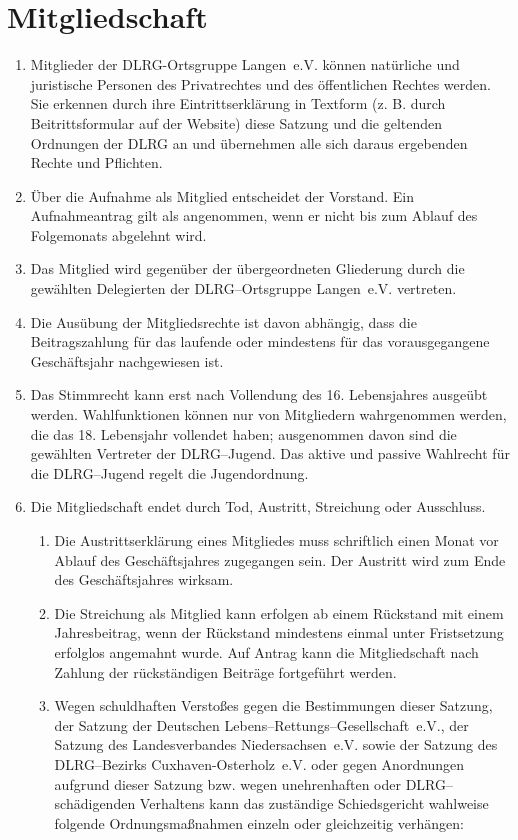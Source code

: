 \documentclass[%
12pt, %
a4paper, %
headsepline, %
parskip, %
headings=normal, %
]{scrreprt}
\begin{document}
\section{Mitgliedschaft}
\label{sec:mitgliedschaft}
\begin{enumerate}
    \item Mitglieder der DLRG-Ortsgruppe Langen~e.V. können natürliche und juristische Personen des Privatrechtes und des öffentlichen Rechtes werden. Sie erkennen durch ihre Eintrittserklärung in Textform (z. B. durch Beitrittsformular auf der Website) diese Satzung und die geltenden Ordnungen der DLRG an und übernehmen alle sich daraus ergebenden Rechte und Pflichten.
    \item Über die Aufnahme als Mitglied entscheidet der Vorstand. Ein Aufnahmeantrag gilt als angenommen, wenn er nicht bis zum Ablauf des Folgemonats abgelehnt wird.
    \item Das Mitglied wird gegenüber der übergeordneten Gliederung durch die gewählten Delegierten der DLRG--Ortsgruppe Langen~e.V. vertreten.
    \item Die Ausübung der Mitgliedsrechte ist davon abhängig, dass die Beitragszahlung für das laufende oder mindestens für das vorausgegangene Geschäftsjahr nachgewiesen ist.
    \item Das Stimmrecht kann erst nach Vollendung des 16. Lebensjahres ausgeübt werden. Wahlfunktionen können nur von Mitgliedern wahrgenommen werden, die das 18. Lebensjahr vollendet haben; ausgenommen davon sind die gewählten Vertreter der DLRG--Jugend. Das aktive und passive Wahlrecht für die DLRG--Jugend regelt die Jugendordnung.
    \item Die Mitgliedschaft endet durch Tod, Austritt, Streichung oder Ausschluss.\begin{enumerate}[noitemsep]
        \item Die Austrittserklärung eines Mitgliedes muss schriftlich einen Monat vor Ablauf des Geschäftsjahres zugegangen sein. Der Austritt wird zum Ende des Geschäftsjahres wirksam.
        \item Die Streichung als Mitglied kann erfolgen ab einem Rückstand mit einem Jahresbeitrag, wenn der Rückstand mindestens einmal unter Fristsetzung erfolglos angemahnt wurde. Auf Antrag kann die Mitgliedschaft nach Zahlung der rückständigen Beiträge fortgeführt werden.
        \item Wegen schuldhaften Verstoßes gegen die Bestimmungen dieser Satzung, der Satzung der Deutschen Lebens--Rettungs--Gesellschaft~e.V., der Satzung des Landesverbandes Niedersachsen~e.V. sowie der Satzung des DLRG--Bezirks Cuxhaven-Osterholz~e.V. oder gegen Anordnungen aufgrund dieser Satzung bzw. wegen unehrenhaften oder DLRG--schädigenden Verhaltens kann das zuständige Schiedsgericht wahlweise folgende Ordnungsmaßnahmen einzeln oder gleichzeitig verhängen:\begin{enumerate}

\end{enumerate}
\end{enumerate}
\end{enumerate}
\end{document}
